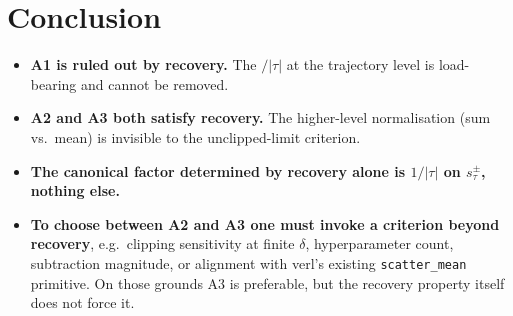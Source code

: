 \documentclass[11pt]{article}
\begin{document}
\section{Conclusion}

\begin{itemize}
\item \textbf{A1 is ruled out by recovery.} The $/|\tau|$ at the
      trajectory level is load-bearing and cannot be removed.
\item \textbf{A2 and A3 both satisfy recovery.} The higher-level
      normalisation (sum vs.\ mean) is invisible to the unclipped-limit
      criterion.
\item \textbf{The canonical factor determined by recovery alone is
      $1/|\tau|$ on $s_\tau^\pm$, nothing else.}
\item \textbf{To choose between A2 and A3 one must invoke a criterion
      beyond recovery}, e.g.\ clipping sensitivity at finite $\delta$,
      hyperparameter count, subtraction magnitude, or alignment with
      verl's existing \texttt{scatter\_mean} primitive. On those grounds
      A3 is preferable, but the recovery property itself does not force
      it.
\end{itemize}
\end{document}
